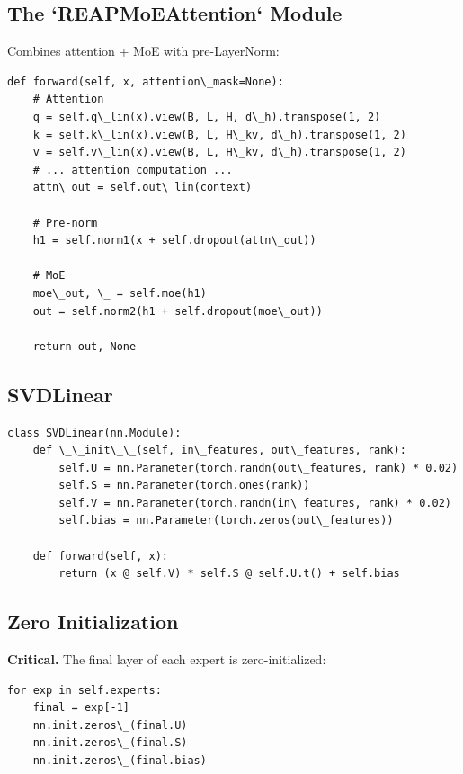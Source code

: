 \subsection{The `REAPMoEAttention` Module}

Combines attention + MoE with pre-LayerNorm:

\begin{lstlisting}
def forward(self, x, attention\_mask=None):
    # Attention
    q = self.q\_lin(x).view(B, L, H, d\_h).transpose(1, 2)
    k = self.k\_lin(x).view(B, L, H\_kv, d\_h).transpose(1, 2)
    v = self.v\_lin(x).view(B, L, H\_kv, d\_h).transpose(1, 2)
    # ... attention computation ...
    attn\_out = self.out\_lin(context)
    
    # Pre-norm
    h1 = self.norm1(x + self.dropout(attn\_out))
    
    # MoE
    moe\_out, \_ = self.moe(h1)
    out = self.norm2(h1 + self.dropout(moe\_out))
    
    return out, None
\end{lstlisting}

\subsection{SVDLinear}

\begin{lstlisting}
class SVDLinear(nn.Module):
    def \_\_init\_\_(self, in\_features, out\_features, rank):
        self.U = nn.Parameter(torch.randn(out\_features, rank) * 0.02)
        self.S = nn.Parameter(torch.ones(rank))
        self.V = nn.Parameter(torch.randn(in\_features, rank) * 0.02)
        self.bias = nn.Parameter(torch.zeros(out\_features))
    
    def forward(self, x):
        return (x @ self.V) * self.S @ self.U.t() + self.bias
\end{lstlisting}

\subsection{Zero Initialization}

\textbf{Critical.} The final layer of each expert is zero-initialized:

\begin{lstlisting}
for exp in self.experts:
    final = exp[-1]
    nn.init.zeros\_(final.U)
    nn.init.zeros\_(final.S)
    nn.init.zeros\_(final.bias)
\end{lstlisting}

